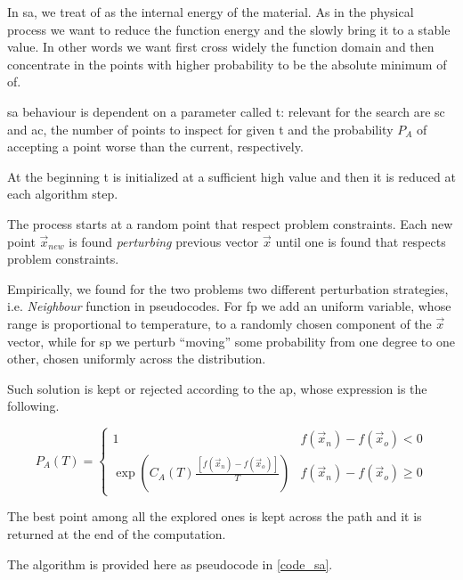 \documentclass[journal]{IEEEtran}
\begin{document}
In \gls{sa}, we treat \gls{of} as the internal energy of the material.
As in the physical process we want to reduce the function energy and the slowly bring it to a stable value. In other words we want first cross widely the function domain and then concentrate in the points with higher probability to be the absolute minimum of \gls{of}.

\gls{sa} behaviour is dependent on a parameter called \gls{t}: relevant for the search are \gls{sc} and \gls{ac}, the number of points to inspect for given \gls{t} and the probability $P_A$ of accepting a point worse than the current, respectively.

At the beginning \gls{t} is initialized at a sufficient high value and then it is reduced at each algorithm step.

The process starts at a random point that respect problem constraints. Each new point $\vec{x}_{new}$ is found \emph{perturbing} previous vector $\vec{x}$ until one is found that respects problem constraints.

Empirically, we found for the two problems two different perturbation strategies, i.e. \emph{Neighbour} function in pseudocodes.
For \gls{fp} we add an uniform variable, whose range is proportional to temperature, to a randomly chosen component of the $\vec{x}$ vector, while for \gls{sp} we perturb ``moving'' some probability from one degree to one other, chosen uniformly across the distribution.

Such solution is kept or rejected according to the \gls{ap}, whose expression is the following.

 \begin{equation*} \label{accept_prob}
	P_A(T) = \begin{cases}
		1 & f(\vec{x}_n)-f (\vec{x}_o) < 0 \\
		\exp{ \left( C_A(T) \frac{
					\, [f(\vec{x}_n) - f(\vec{x}_o)] }{T} \right) }
		& f (\vec{x}_n)-f(\vec{x}_o) \geq 0
  \end{cases}
 \end{equation*}

The best point among all the explored ones is kept across the path and it is returned at the end of the computation.

The algorithm is provided here as pseudocode in \autoref{code_sa}.
\end{document}
